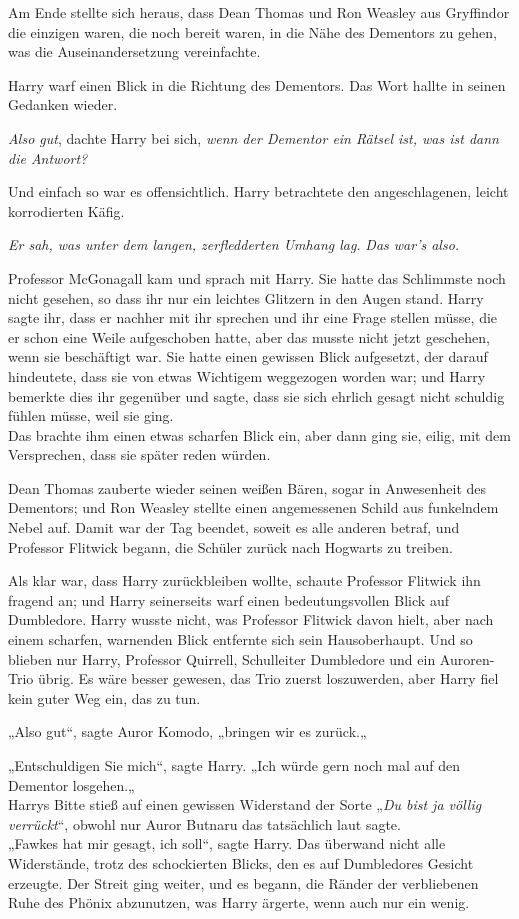 {Am Ende stellte sich heraus, dass Dean Thomas und Ron Weasley aus Gryffindor die einzigen waren, die noch bereit waren, in die Nähe des Dementors zu gehen, was die Auseinandersetzung vereinfachte.

Harry warf einen Blick in die Richtung des Dementors. Das Wort hallte in seinen Gedanken wieder.

\emph{Also gut}, dachte Harry bei sich, \emph{wenn der Dementor ein Rätsel ist, was ist dann die Antwort?}

Und einfach so war es offensichtlich. Harry betrachtete den angeschlagenen, leicht korrodierten Käfig.

\emph{Er sah, was unter dem langen, zerfledderten Umhang lag.} \emph{Das war's also.}

Professor McGonagall kam und sprach mit Harry. Sie hatte das Schlimmste noch nicht gesehen, so dass ihr nur ein leichtes Glitzern in den Augen stand. Harry sagte ihr, dass er nachher mit ihr sprechen und ihr eine Frage stellen müsse, die er schon eine Weile aufgeschoben hatte, aber das musste nicht jetzt geschehen, wenn sie beschäftigt war. Sie hatte einen gewissen Blick aufgesetzt, der darauf hindeutete, dass sie von etwas Wichtigem weggezogen worden war; und Harry bemerkte dies ihr gegenüber und sagte, dass sie sich ehrlich gesagt nicht schuldig fühlen müsse, weil sie ging.\\ Das brachte ihm einen etwas scharfen Blick ein, aber dann ging sie, eilig, mit dem Versprechen, dass sie später reden würden.

Dean Thomas zauberte wieder seinen weißen Bären, sogar in Anwesenheit des Dementors; und Ron Weasley stellte einen angemessenen Schild aus funkelndem Nebel auf. Damit war der Tag beendet, soweit es alle anderen betraf, und Professor Flitwick begann, die Schüler zurück nach Hogwarts zu treiben.

Als klar war, dass Harry zurückbleiben wollte, schaute Professor Flitwick ihn fragend an; und Harry seinerseits warf einen bedeutungsvollen Blick auf Dumbledore. Harry wusste nicht, was Professor Flitwick davon hielt, aber nach einem scharfen, warnenden Blick entfernte sich sein Hausoberhaupt. Und so blieben nur Harry, Professor Quirrell, Schulleiter Dumbledore und ein Auroren-Trio übrig. Es wäre besser gewesen, das Trio zuerst loszuwerden, aber Harry fiel kein guter Weg ein, das zu tun.

„Also gut“, sagte Auror Komodo, „bringen wir es zurück.„

„Entschuldigen Sie mich“, sagte Harry. „Ich würde gern noch mal auf den Dementor losgehen.„\\ Harrys Bitte stieß auf einen gewissen Widerstand der Sorte „\emph{Du bist ja völlig verrückt}“, obwohl nur Auror Butnaru das tatsächlich laut sagte.\\ „Fawkes hat mir gesagt, ich soll“, sagte Harry. Das überwand nicht alle Widerstände, trotz des schockierten Blicks, den es auf Dumbledores Gesicht erzeugte. Der Streit ging weiter, und es begann, die Ränder der verbliebenen Ruhe des Phönix abzunutzen, was Harry ärgerte, wenn auch nur ein wenig.

}
